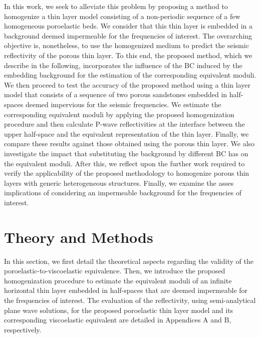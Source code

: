 \documentclass[draft]{agujournal2019}
\begin{document}
In this work, we seek to alleviate this problem by proposing a method to homogenize a  thin layer model consisting of a non-periodic sequence of a few homogeneous poroelastic beds. We consider that this thin layer is embedded in a background deemed impermeable for the frequencies of interest. The overarching objective is, nonetheless, to use the homogenized medium to predict the seismic reflectivity of the porous thin layer.
To this end, the proposed method, which we describe in the following, incorporates the influence of the BC induced by the embedding background for the estimation of the corresponding equivalent moduli.
We then proceed to
test the accuracy of the proposed method using a thin layer model that consists of a sequence of two  porous sandstones embedded in half-spaces deemed impervious for the seismic frequencies. We estimate the corresponding equivalent moduli by applying the proposed homogenization procedure and then calculate P-wave reflectivities at the interface between the upper half-space and the equivalent representation of the thin layer. Finally, we compare these results against those obtained using the porous thin layer. We also investigate the impact that substituting the background by different BC has on the equivalent moduli. After this, we reflect upon the further work required to verify the applicability of the proposed methodology to homogenize porous thin layers with generic heterogeneous structures. Finally, we examine the asses implications of considering an impermeable background for the frequencies of interest.
 
\section{Theory and Methods}
In this section, we first  detail the theoretical aspects regarding the validity of the poroelastic-to-viscoelastic equivalence. Then, we introduce the proposed homogenization procedure to estimate the equivalent moduli of an infinite horizontal thin layer embedded in half-spaces that are deemed impermeable for the frequencies of interest.  
The evaluation of the reflectivity, using  semi-analytical plane wave solutions, for the proposed poroelastic thin layer model and its corresponding viscoelastic equivalent are detailed in Appendices A and B, respectively.
\end{document}
